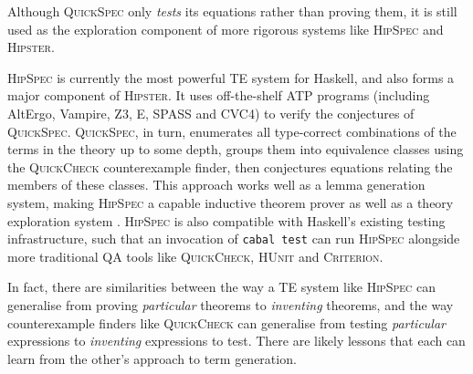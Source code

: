 \documentclass[]{article}
\begin{document}
Although \textsc{QuickSpec} only \emph{tests} its equations rather than proving them, it is still used as the exploration component of more rigorous systems like \textsc{HipSpec} and \textsc{Hipster}.

\textsc{HipSpec} is currently the most powerful TE system for Haskell, and also forms a major component of \textsc{Hipster}. It uses off-the-shelf ATP programs (including AltErgo, Vampire, Z3, E, SPASS and CVC4) to verify the conjectures of \textsc{QuickSpec}. \textsc{QuickSpec}, in turn, enumerates all type-correct combinations of the terms in the theory up to some depth, groups them into equivalence classes using the \textsc{QuickCheck} counterexample finder, then conjectures equations relating the members of these classes. This approach works well as a lemma generation system, making \textsc{HipSpec} a capable inductive theorem prover as well as a theory exploration system \cite{claessen2013automating}. \textsc{HipSpec} is also compatible with Haskell's existing testing infrastructure, such that an invocation of \texttt{cabal test} can run \textsc{HipSpec} alongside more traditional QA tools like \textsc{QuickCheck}, \textsc{HUnit} and \textsc{Criterion}.

In fact, there are similarities between the way a TE system like \textsc{HipSpec} can generalise from proving \emph{particular} theorems to \emph{inventing} theorems, and the way counterexample finders like \textsc{QuickCheck} can generalise from testing \emph{particular} expressions to \emph{inventing} expressions to test. There are likely lessons that each can learn from the other's approach to term generation.




\end{document}
